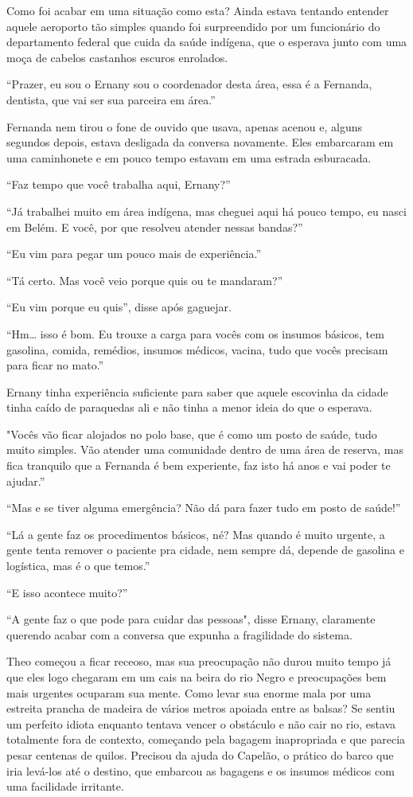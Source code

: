 Como foi acabar em uma situação como esta? Ainda estava tentando
entender aquele aeroporto tão simples quando foi surpreendido por um
funcionário do departamento federal que cuida da saúde indígena, que o
esperava junto com uma moça de cabelos castanhos escuros enrolados.

``Prazer, eu sou o Ernany sou o coordenador desta área, essa é a
Fernanda, dentista, que vai ser sua parceira em área.''

Fernanda nem tirou o fone de ouvido que usava, apenas acenou e, alguns
segundos depois, estava desligada da conversa novamente. Eles embarcaram
em uma caminhonete e em pouco tempo estavam em uma estrada esburacada.

``Faz tempo que você trabalha aqui, Ernany?''

``Já trabalhei muito em área indígena, mas cheguei aqui há pouco tempo,
eu nasci em Belém. E você, por que resolveu atender nessas bandas?''

``Eu vim para pegar um pouco mais de experiência.''

``Tá certo. Mas você veio porque quis ou te mandaram?''

``Eu vim porque eu quis'', disse após gaguejar.

``Hm\ldots{} isso é bom. Eu trouxe a carga para vocês com os insumos
básicos, tem gasolina, comida, remédios, insumos médicos, vacina, tudo
que vocês precisam para ficar no mato.''

Ernany tinha experiência suficiente para saber que aquele escovinha da
cidade tinha caído de paraquedas ali e não tinha a menor ideia do que o
esperava.

"Vocês vão ficar alojados no polo base, que é como um posto de saúde,
tudo muito simples. Vão atender uma comunidade dentro de uma área de
reserva, mas fica tranquilo que a Fernanda é bem experiente, faz isto há
anos e vai poder te ajudar.''

``Mas e se tiver alguma emergência? Não dá para fazer tudo em posto de
saúde!''

``Lá a gente faz os procedimentos básicos, né? Mas quando é muito
urgente, a gente tenta remover o paciente pra cidade, nem sempre dá,
depende de gasolina e logística, mas é o que temos.''

``E isso acontece muito?''

``A gente faz o que pode para cuidar das pessoas", disse Ernany,
claramente querendo acabar com a conversa que expunha a fragilidade do
sistema.

Theo começou a ficar receoso, mas sua preocupação não durou muito tempo
já que eles logo chegaram em um cais na beira do rio Negro e
preocupações bem mais urgentes ocuparam sua mente. Como levar sua enorme
mala por uma estreita prancha de madeira de vários metros apoiada entre
as balsas? Se sentiu um perfeito idiota enquanto tentava vencer o
obstáculo e não cair no rio, estava totalmente fora de contexto,
começando pela bagagem inapropriada e que parecia pesar centenas de
quilos. Precisou da ajuda do Capelão, o prático do barco que iria
levá-los até o destino, que embarcou as bagagens e os insumos médicos
com uma facilidade irritante.

